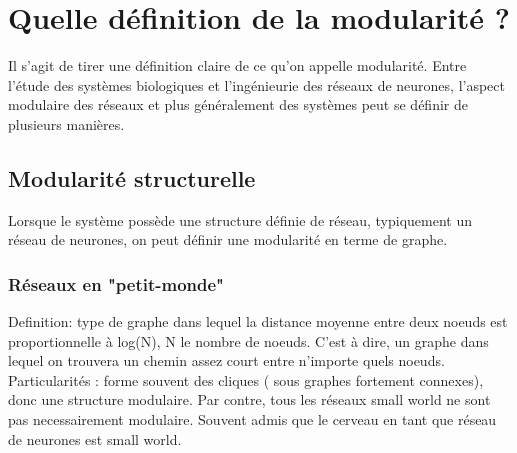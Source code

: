 
\section{Quelle définition de la modularité ?}

Il s'agit de tirer une définition claire de ce qu'on appelle modularité. Entre l'étude des systèmes biologiques et l'ingénieurie des réseaux de neurones, l'aspect modulaire des réseaux et plus généralement des systèmes peut se définir de plusieurs manières. 

\subsection{Modularité structurelle}

Lorsque le système possède une structure définie de réseau, typiquement un réseau de neurones, on peut définir une modularité en terme de graphe.

\subsubsection{Réseaux en "petit-monde"}
Definition: type de graphe dans lequel la distance moyenne entre deux noeuds est proportionnelle à log(N), N le nombre de noeuds. C'est à dire, un graphe dans lequel on trouvera un chemin assez court entre n'importe quels noeuds. 
Particularités : forme souvent des cliques ( sous graphes fortement connexes), donc une structure modulaire. Par contre, tous les réseaux small world ne sont pas necessairement modulaire. 
Souvent admis que le cerveau en tant que réseau de neurones est small world. 

